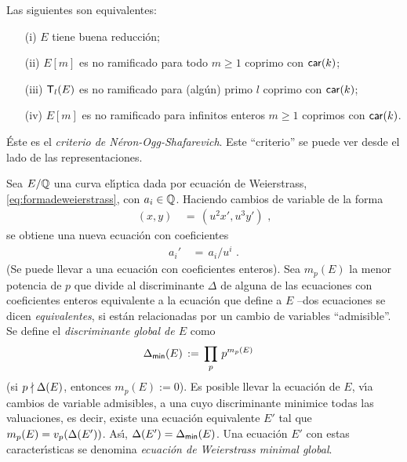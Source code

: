 \begin{teoNOS}\label{thm:NOS}
	Las siguientes son equivalentes:
	\begin{itemize}
		\item[(i)] $E$ tiene buena reducci\'{o}n;
		\item[(ii)] $E[m]$ es no ramificado para todo $m\geq 1$ coprimo
			con $\char k$;
		\item[(iii)] $\tate[l](E)$ es no ramificado para (alg\'{u}n)
			primo $l$ coprimo con $\char k$;
		\item[(iv)] $E[m]$ es no ramificado para infinitos enteros
			$m\geq 1$ coprimos con $\char k$.
	\end{itemize}
\end{teoNOS}

\'{E}ste es el \emph{criterio de N\'{e}ron-Ogg-Shafarevich}. Este ``criterio''
se puede ver desde el lado de las representaciones.

Sea $E/\bb Q$ una curva el\'{\i}ptica dada por ecuaci\'{o}n de Weierstrass,
\eqref{eq:formadeweierstrass}, con $a_i\in\bb Q$. Haciendo cambios de variable
de la forma
\begin{align*}
	(x,y) & \,=\,(u^2x',u^3y')
	\text{ ,}
\end{align*}
%
se obtiene una nueva ecuaci\'{o}n con coeficientes
\begin{align*}
	a_i' & \,=\, a_i/u^i
	\text{ .}
\end{align*}
%
(Se puede llevar a una ecuaci\'{o}n con coeficientes enteros). Sea $m_p(E)$ la
menor potencia de $p$ que divide al discriminante $\Delta$ de alguna de las
ecuaciones con coeficientes enteros equivalente a la ecuaci\'{o}n que define a
$E$ --dos ecuaciones se dicen \emph{equivalentes}, si est\'{a}n relacionadas
por un cambio de variables ``admisible''. Se define el \emph{discriminante %
global de $E$} como
\begin{align*}
	\mindisc(E) & \,:=\,\prod_p\,p^{m_p(E)}
\end{align*}
%
(si $p\nmid\discriminante(E)$, entonces $m_p(E):=0$). Es posible llevar la
ecuaci\'{o}n de $E$, v\'{\i}a cambios de variable admisibles, a una cuyo
discriminante minimice todas las valuaciones, es decir, existe una ecuaci\'{o}n
equivalente $E'$ tal que
\begin{math}
	m_p(E)=v_p(\discriminante(E'))
\end{math}. As\'{\i}, $\discriminante(E')=\mindisc(E)$. Una ecuaci\'{o}n $E'$
con estas caracter\'{\i}sticas se denomina \emph{ecuaci\'{o}n de Weierstrass %
minimal global}.

